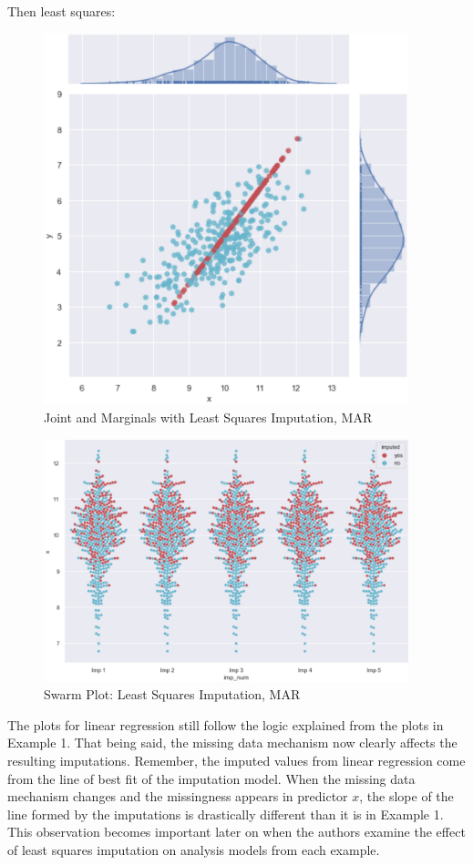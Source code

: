 \documentclass[12pt,oneside]{chicagocapstone}
\begin{document}
Then least squares:
\begin{figure}

{\centering \includegraphics[width=400px]{figure/multi-lm-mar} 

}

\caption{Joint and Marginals with Least Squares Imputation, MAR}\label{fig:multi-lm-mar}
\end{figure}
\begin{figure}

{\centering \includegraphics[width=400px]{figure/swarm-lm-mar} 

}

\caption{Swarm Plot: Least Squares Imputation, MAR}\label{fig:swarm-lm-mar}
\end{figure}
The plots for linear regression still follow the logic explained from
the plots in Example 1. That being said, the missing data mechanism now
clearly affects the resulting imputations. Remember, the imputed values
from linear regression come from the line of best fit of the imputation
model. When the missing data mechanism changes and the missingness
appears in predictor \(x\), the slope of the line formed by the
imputations is drastically different than it is in Example 1. This
observation becomes important later on when the authors examine the
effect of least squares imputation on analysis models from each example.
\end{document}

